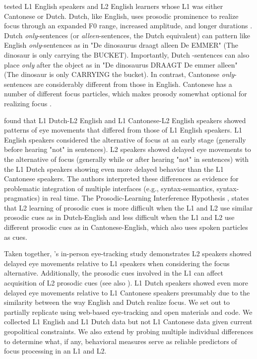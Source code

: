 \cite{Ge2021} tested L1 English speakers and L2 English learners whose L1 was either Cantonese or Dutch. Dutch, like English, uses prosodic prominence to realize focus through an expanded F0 range, increased amplitude, and longer durations \citep{dimitrova2010focus}. Dutch \textit{only}-sentences (or \textit{alleen}-sentences, the Dutch equivalent) can pattern like English \textit{only}-sentences as in "De dinosaurus draagt alleen De EMMER" (The dinosaur is only carrying the BUCKET). Importantly, Dutch -sentences can also place \textit{only} after the object as in "De dinosaurus DRAAGT De emmer alleen" (The dinosaur is only CARRYING the bucket). In contrast, Cantonese \textit{only}-sentences are considerably different from those in English. Cantonese has a number of different focus particles, which makes prosody somewhat optional for realizing focus \citep{lee2019focus, wu2010prosodic, ge2024bilingual, fung2000final}. 

\cite{Ge2021} found that L1 Dutch-L2 English and L1 Cantonese-L2 English speakers showed patterns of eye movements that differed from those of L1 English speakers. L1 English speakers considered the alternative of focus at an early stage (generally before hearing "not" in sentences). L2 speakers showed delayed eye movements to the alternative of focus (generally while or after hearing "not" in sentences) with the L1 Dutch speakers showing even more delayed behavior than the L1 Cantonese speakers. The authors interpreted these differences as evidence for problematic integration of multiple interfaces (e.g., syntax-semantics, syntax-pragmatics) in real time. The Prosodic-Learning Interference Hypothesis \citep{tremblay2016effects, tremblay2021re}, states that L2 learning of prosodic cues is more difficult when the L1 and L2 use similar prosodic cues as in Dutch-English and less difficult when the L1 and L2 use different prosodic cues as in Cantonese-English, which also uses spoken particles as cues.

Taken together, \cite{Ge2021}'s in-person eye-tracking study demonstrates L2 speakers showed delayed eye movements relative to L1 speakers when considering the focus alternative. Additionally, the prosodic cues involved in the L1 can affect acquisition of L2 prosodic cues (see also \cite{ge2021comprehension}). L1 Dutch speakers showed even more delayed eye movements relative to L1 Cantonese speakers presumably due to the similarity between the way English and Dutch realize focus. We set out to partially replicate \cite{Ge2021} using web-based eye-tracking and open materials and code. We collected L1 English and L1 Dutch data but not L1 Cantonese data given current geopolitical constraints. We also extend \cite{Ge2021} by probing multiple individual differences to determine what, if any, behavioral measures serve as reliable predictors of focus processing in an L1 and L2. 

